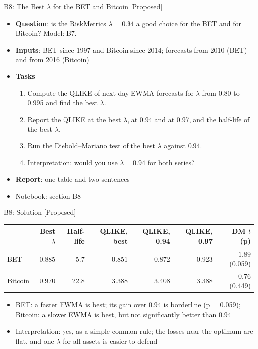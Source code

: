 \begin{frame}{B8: The Best $\lambda$ for the BET and Bitcoin [Proposed]}
\itemsize{\footnotesize}
\begin{itemize}
\item \textbf{Question}: is the RiskMetrics $\lambda = 0.94$ a good choice for the BET and for Bitcoin? Model: B7.
\item \textbf{Inputs}: BET since 1997 and Bitcoin since 2014; forecasts from 2010 (BET) and from 2016 (Bitcoin)
\item \textbf{Tasks}
\begin{enumerate}
    \item Compute the QLIKE of next-day EWMA forecasts for $\lambda$ from 0.80 to 0.995 and find the best $\lambda$.
    \item Report the QLIKE at the best $\lambda$, at 0.94 and at 0.97, and the half-life of the best $\lambda$.
    \item Run the Diebold--Mariano test of the best $\lambda$ against 0.94.
    \item Interpretation: would you use $\lambda = 0.94$ for both series?
\end{enumerate}
\item \textbf{Report}: one table and two sentences
\item Notebook: section B8
\end{itemize}
\end{frame}

\ifsolutions
\begin{frame}{B8: Solution [Proposed]}
\itemsize{\footnotesize}
\begin{center}
\footnotesize
\begin{tabular}{lrrrrrr}
\toprule
& \textbf{Best} $\lambda$ & \textbf{Half-life} & QLIKE, \textbf{best} & QLIKE, 0.94 & QLIKE, 0.97 & DM $t$ (p) \\
\midrule
BET & 0.885 & 5.7 & 0.851 & 0.872 & 0.923 & ${-1.89}$ (0.059) \\
Bitcoin & 0.970 & 22.8 & 3.388 & 3.408 & 3.388 & ${-0.76}$ (0.449) \\
\bottomrule
\end{tabular}
\end{center}
\begin{itemize}
    \item BET: a faster EWMA is best; its gain over 0.94 is borderline (p = 0.059); Bitcoin: a slower EWMA is best, but not significantly better than 0.94
    \item Interpretation: yes, as a simple common rule; the losses near the optimum are flat, and one $\lambda$ for all assets is easier to defend
\end{itemize}
\end{frame}
\fi


